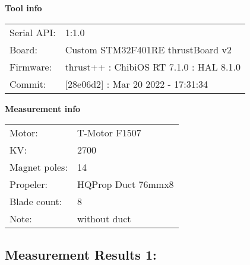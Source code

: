 \documentclass[10pt]{article}
\begin{document}
\noindent
{\large \bf Tool info}
\vspace{3mm}

\noindent
\begin{tabular}{ll}
Serial API:  & 1:1.0\\ 
Board:       & Custom STM32F401RE thrustBoard v2\\ 
Firmware:    & thrust++ : ChibiOS RT 7.1.0 : HAL 8.1.0\\ 
Commit:      & [28e06d2] : Mar 20 2022 - 17:31:34
\end{tabular}
\vspace{3mm}

\noindent
{\large \bf Measurement info}
\vspace{3mm}

\noindent
\begin{tabular}{ll}
Motor:        & T-Motor F1507\\ 
KV:           & 2700\\ 
Magnet poles: & 14\\ 
Propeler:     & HQProp Duct 76mmx8\\ 
Blade count:  & 8\\ 
Note:         & without duct
\end{tabular}

\vspace{3mm}


\subsection*{\large \bf Measurement Results 1:}
\end{document}
